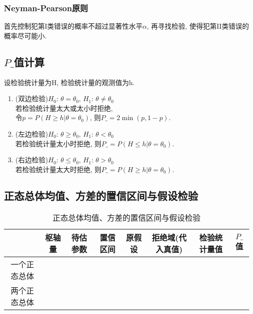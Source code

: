\subsubsection{Neyman-Pearson原则}
首先控制犯第I类错误的概率不超过显著性水平$\alpha$, 再寻找检验, 使得犯第II类错误的概率尽可能小. 

\subsection{\texorpdfstring{$P\_$}.值计算}
设检验统计量为H, 检验统计量的观测值为h. 
\begin{enumerate}
    \item (双边检验)$H_0:\, \theta=\theta_0,\, H_1:\, \theta\ne\theta_0$\\
    若检验统计量太大或太小时拒绝, \\
    令$p=P(H\ge h|\theta=\theta_0)$, 则$P\_=2\min(p,1-p)$. 
    \item (左边检验)$H_0:\, \theta\ge\theta_0,\, H_1:\, \theta<\theta_0$\\
    若检验统计量太小时拒绝, 则$P\_=P(H\le h|\theta=\theta_0 )$. 
    \item (右边检验)$H_0:\, \theta\le\theta_0,\, H_1:\, \theta > \theta_0$\\
    若检验统计量太大时拒绝, 则$P\_=P(H\ge h|\theta=\theta_0 )$. 
\end{enumerate}

\subsection{正态总体均值、方差的置信区间与假设检验}

\begin{table*}[htb]
    \centering
    \begin{tabular}[c]{|cccccccc|}\hline
        \multicolumn{1}{|c|}{ } & 枢轴量 & 待估参数 & 置信区间 & 原假设 & 拒绝域(代入真值) & 检验统计量值 & $P\_$值 \\ \hline
        \multicolumn{1}{|c|}{\multirow{3}{2em}{一个正态总体}} & & & & & & & \\
        \multicolumn{1}{|c|}{ }& & & & & & & \\
        \multicolumn{1}{|c|}{ }& & & & & & & \\ \hline
        \multicolumn{1}{|c|}{\multirow{3}{2em}{两个正态总体}} & & & & & & & \\
        \multicolumn{1}{|c|}{ }& & & & & & & \\
        \multicolumn{1}{|c|}{ }& & & & & & & \\ \hline
    \end{tabular}
    \caption{正态总体均值、方差的置信区间与假设检验}
\end{table*}

